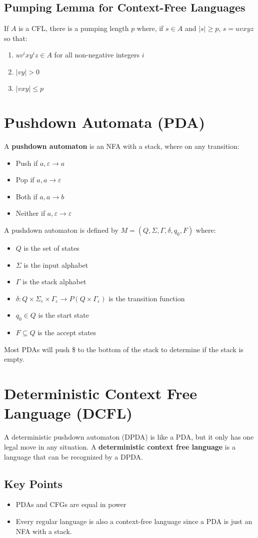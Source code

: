 \documentclass{article}
\begin{document}
\subsection*{Pumping Lemma for Context-Free Languages}
If $A$ is a CFL, there is a pumping length $p$ where, if $s\in A$ and $|s|\geq p$, $s=uvxyz$ so that:
\begin{enumerate}
    \item $uv^i xy^i z\in A$ for all non-negative integers $i$
    \item $|vy|>0$
    \item $|vxy|\leq p$
\end{enumerate}

\section*{Pushdown Automata (PDA)}
A \textbf{pushdown automaton} is an NFA with a stack, where on any transition:
\begin{itemize}
    \item Push if $a, \varepsilon\rightarrow a$
    \item Pop if $a, a\rightarrow\varepsilon$
    \item Both if $a, a\rightarrow b$
    \item Neither if $a, \varepsilon\rightarrow\varepsilon$
\end{itemize}

A pushdown automaton is defined by $M=(Q,\Sigma, \Gamma, \delta, q_0, F)$ where:
\begin{itemize}
    \item $Q$ is the set of states
    \item $\Sigma$ is the input alphabet
    \item $\Gamma$ is the stack alphabet
    \item $\delta: Q\times\Sigma_\varepsilon\times\Gamma_\varepsilon\rightarrow P(Q\times\Gamma_\varepsilon)$ is the transition function
    \item $q_0\in Q$ is the start state
    \item $F\subseteq Q$ is the accept states
\end{itemize}

Most PDAs will push \$ to the bottom of the stack to determine if the stack is empty.

\section*{Deterministic Context Free Language (DCFL)}
A deterministic pushdown automaton (DPDA) is like a PDA, but it only has one legal move in any situation. A \textbf{deterministic context free language} is a language that can be recognized by a DPDA.

\subsection*{Key Points}
\begin{itemize}
    \item PDAs and CFGs are equal in power
    \item Every regular language is also a context-free language since a PDA is just an NFA with a stack.
\end{itemize}
\end{document}
